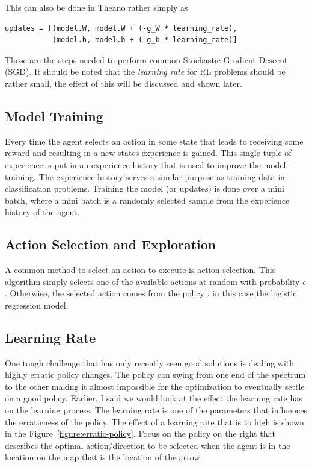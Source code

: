This can also be done in Theano rather simply as 

\begin{lstlisting}
updates = [(model.W, model.W + (-g_W * learning_rate),
           (model.b, model.b + (-g_b * learning_rate)]
\end{lstlisting}


Those are the steps needed to perform common Stochastic Gradient Descent (SGD). It should be noted that the \textit{learning rate} \learningRate for RL problems should be rather small, the effect of this will be discussed and shown later.

\subsection{Model Training}

Every time the agent selects an action \action in some state \state that leads to receiving some reward \reward and resulting in a new states \nextState experience is gained. This single tuple of experience is put in an experience history that is used to improve the model training. The experience history serves a similar purpose as training data in classification problems. 
Training the model (or updates) is done over a mini batch, where a mini batch is a randomly selected sample from the experience history of the agent. 

\subsection{Action Selection and Exploration}

A common method to select an action to execute is \eGreedy action selection. This algorithm simply selects one of the available actions at random with probability $\epsilon$. Otherwise, the selected action comes from the policy \policyFunction{\state}{}, in this case the logistic regression model.

\subsection{Learning Rate}

One tough challenge that has only recently seen good solutions is dealing with highly erratic policy changes. The policy can swing from one end of the spectrum to the other making it almost impossible for the optimization to eventually settle on a good policy.
Earlier, I said we would look at the effect the learning rate has on the learning process. The learning rate is one of the parameters that influences the erraticness of the policy. The effect of a learning rate that is to high is shown in the Figure~\ref{figure:erratic-policy}. Focus on the policy on the right that describes the optimal action/direction to be selected when the agent is in the location on the map that is the location of the arrow.

